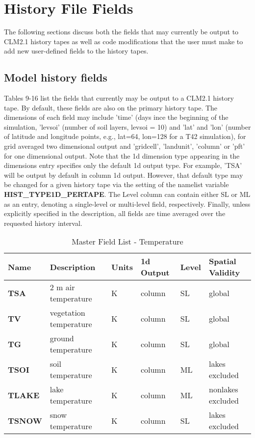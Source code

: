 \section {History File Fields}
\label{sec_history_file}
The following sections discuss both the fields that may currently be
output to CLM2.1 history tapes as well as code modifications that the
user must make to add new user-defined fields to the history tapes.

\subsection {Model history fields}
Tables 9-16 list the fields that currently may be output to a CLM2.1
history tape. By default, these fields are also on the primary history
tape.  The dimensions of each field may include 'time' (days ince the
beginning of the simulation, 'levsoi' (number of soil layers, levsoi =
10) and 'lat' and 'lon' (number of latitude and longitude points,
e.g., lat=64, lon=128 for a T42 simulation), for grid averaged two
dimensional output and 'gridcell', 'landunit', 'column' or 'pft' for
one dimensional output.  Note that the 1d dimension type appearing in
the dimensions entry specifies only the default 1d output type. For
example, 'TSA' will be output by default in column 1d output. However,
that default type may be changed for a given history tape via the
setting of the namelist variable {\bf HIST\_TYPE1D\_PERTAPE}. The
Level column can contain either SL or ML as an entry, denoting a
single-level or multi-level field, respectively. Finally, unless
explicitly specified in the description, all fields are time averaged
over the requested history interval.

\begin{longtable}{|l|p{2.3in}|l|l|l|p{1.0in}|} 
\caption{\label{table_master_field_list} Master Field List - Temperature} \\
\hline
\endhead
\hline
Name & Description & Units & 1d Output & Level & Spatial Validity  \\ 
\hline	\hline	

{\bf TSA} 
& 2 m air temperature 
& K       
& column  
& SL 
& global  \\
\hline	

{\bf TV} 
& vegetation temperature 
& K       
& column  
& SL 
& global \\
\hline	

{\bf TG}
& ground temperature
& K        
& column
& SL 
& global \\
\hline	

{\bf TSOI}
& soil temperature 
& K       
& column  
& ML 
& lakes excluded \\  
\hline	

{\bf TLAKE} 
& lake temperature
& K        
& column
& ML 
& nonlakes excluded \\
\hline	

{\bf TSNOW}
& snow temperature 
& K         
& column
& SL 
& lakes excluded \\ 
\hline	

\end{longtable}

